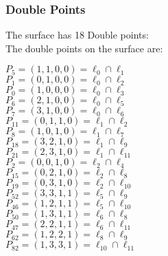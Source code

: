 \documentclass{article}
\begin{document}
{\subsubsection*{Double Points}
The surface has 18 Double points:\\
The double points on the surface are:\\
\begin{multicols}{2}
\noindent
$P_{5} = ( 1, 1, 0, 0 ) = \ell_{0} \cap \ell_{1} $\\
$P_{1} = ( 0, 1, 0, 0 ) = \ell_{0} \cap \ell_{2} $\\
$P_{0} = ( 1, 0, 0, 0 ) = \ell_{0} \cap \ell_{3} $\\
$P_{6} = ( 2, 1, 0, 0 ) = \ell_{0} \cap \ell_{5} $\\
$P_{7} = ( 3, 1, 0, 0 ) = \ell_{0} \cap \ell_{6} $\\
$P_{11} = ( 0, 1, 1, 0 ) = \ell_{1} \cap \ell_{2} $\\
$P_{8} = ( 1, 0, 1, 0 ) = \ell_{1} \cap \ell_{7} $\\
$P_{18} = ( 3, 2, 1, 0 ) = \ell_{1} \cap \ell_{9} $\\
$P_{21} = ( 2, 3, 1, 0 ) = \ell_{1} \cap \ell_{11} $\\
$P_{2} = ( 0, 0, 1, 0 ) = \ell_{2} \cap \ell_{4} $\\
$P_{15} = ( 0, 2, 1, 0 ) = \ell_{2} \cap \ell_{8} $\\
$P_{19} = ( 0, 3, 1, 0 ) = \ell_{2} \cap \ell_{10} $\\
$P_{52} = ( 3, 3, 1, 1 ) = \ell_{5} \cap \ell_{9} $\\
$P_{46} = ( 1, 2, 1, 1 ) = \ell_{5} \cap \ell_{10} $\\
$P_{50} = ( 1, 3, 1, 1 ) = \ell_{6} \cap \ell_{8} $\\
$P_{47} = ( 2, 2, 1, 1 ) = \ell_{6} \cap \ell_{11} $\\
$P_{62} = ( 1, 2, 2, 1 ) = \ell_{8} \cap \ell_{9} $\\
$P_{82} = ( 1, 3, 3, 1 ) = \ell_{10} \cap \ell_{11} $\\
\end{multicols}
}
\end{document}
